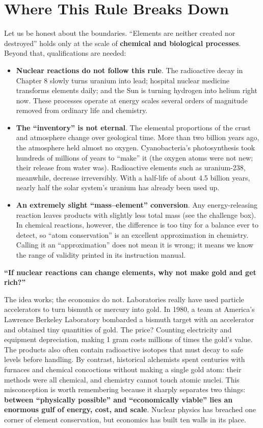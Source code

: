 \section{Where This Rule Breaks Down}

Let us be honest about the boundaries. ``Elements are neither created nor destroyed'' holds only at the scale of \textbf{chemical and biological processes}. Beyond that, qualifications are needed:

\begin{itemize}[itemsep=2pt]
\item \textbf{Nuclear reactions do not follow this rule}. The radioactive decay in Chapter 8 slowly turns uranium into lead; hospital nuclear medicine transforms elements daily; and the Sun is turning hydrogen into helium right now. These processes operate at energy scales several orders of magnitude removed from ordinary life and chemistry.
\item \textbf{The ``inventory'' is not eternal}. The elemental proportions of the crust and atmosphere change over geological time. More than two billion years ago, the atmosphere held almost no oxygen. Cyanobacteria's photosynthesis took hundreds of millions of years to ``make'' it (the oxygen atoms were not new; their release from water was). Radioactive elements such as uranium-238, meanwhile, decrease irreversibly. With a half-life of about 4.5 billion years, nearly half the solar system's uranium has already been used up.
\item \textbf{An extremely slight ``mass--element'' conversion}. Any energy-releasing reaction leaves products with slightly less total mass (see the challenge box). In chemical reactions, however, the difference is too tiny for a balance ever to detect, so ``atom conservation'' is an excellent approximation in chemistry. Calling it an ``approximation'' does not mean it is wrong; it means we know the range of validity printed in its instruction manual.
\end{itemize}

\begin{wuqu}
\textbf{``If nuclear reactions can change elements, why not make gold and get rich?''}

The idea works; the economics do not. Laboratories really have used particle accelerators to turn bismuth or mercury into gold. In 1980, a team at America's Lawrence Berkeley Laboratory bombarded a bismuth target with an accelerator and obtained tiny quantities of gold. The price? Counting electricity and equipment depreciation, making 1 gram costs millions of times the gold's value. The products also often contain radioactive isotopes that must decay to safe levels before handling. By contrast, historical alchemists spent centuries with furnaces and chemical concoctions without making a single gold atom: their methods were all chemical, and chemistry cannot touch atomic nuclei. This misconception is worth remembering because it sharply separates two things: \textbf{between ``physically possible'' and ``economically viable'' lies an enormous gulf of energy, cost, and scale}. Nuclear physics has breached one corner of element conservation, but economics has built ten walls in its place.
\end{wuqu}

